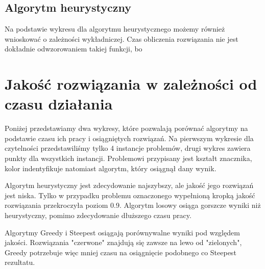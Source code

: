 \documentclass[a4paper,10pt]{article}
\begin{document}
\subsection{Algorytm heurystyczny}
Na podstawie wykresu dla algorytmu heurystycznego możemy również wnioskować o zależności wykładniczej.
Czas obliczenia rozwiązania nie jest dokładnie odwzorowaniem takiej funkcji, bo 
\begin{center} 

\end{center}

%

\section{Jakość rozwiązania w zależności od czasu działania}
Poniżej przedstawiamy dwa wykresy, które pozwalają porównać algorytmy na podstawie czasu ich pracy i osiągniętych rozwiązań.
Na pierwszym wykresie dla czytelności przedstawiliśmy tylko 4 instancje problemów, drugi wykres zawiera punkty dla wszystkich instancji. 
Problemowi przypisany jest kształt znacznika, kolor indentyfikuje natomiast algorytm, który osiągnął dany wynik.

Algorytm heurystyczny jest zdecydowanie najszybszy, ale jakość jego rozwiązań jest niska. 
Tylko w przypadku problemu oznaczonego wypełnioną kropką jakość rozwiązania przekroczyła poziom 0.9.
Algorytm losowy osiąga gorszcze wyniki niż heurystyczny, pomimo zdecydowanie dłuższego czasu pracy.

Algorytmy Greedy i Steepest osiągają porównywalne wyniki pod względem jakości.
Rozwiązania "czerwone" znajdują się zawsze na lewo od "zielonych", Greedy potrzebuje więc mniej czasu na osiągnięcie podobnego co Steepest rezultatu.
\begin{center}

\end{center}
\begin{center}

\end{center}
\end{document}
